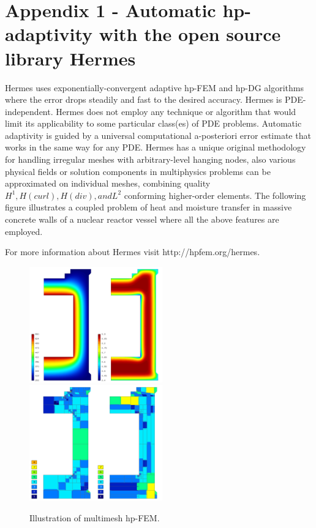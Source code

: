 \documentclass[12pt]{elsarticle}
\begin{document}
\section{Appendix 1 - Automatic hp-adaptivity with the open source library Hermes}

Hermes uses exponentially-convergent adaptive hp-FEM and hp-DG algorithms where the error drops steadily and fast to the desired accuracy.
Hermes is PDE-independent. Hermes does not employ any technique or algorithm that would limit its applicability to some particular class(es) of PDE problems. Automatic adaptivity is guided by a universal computational a-posteriori error estimate that works in the same way for any PDE.
Hermes has a unique original methodology for handling irregular meshes with arbitrary-level hanging nodes, also various physical fields or solution components in multiphysics problems can be approximated on individual meshes, combining quality $H^1, H(curl), H(div), and L^2$ conforming higher-order elements. The following figure illustrates a coupled problem of heat and moisture transfer in massive concrete walls of a nuclear reactor vessel where all the above features are employed.

For more information about Hermes visit {http://hpfem.org/hermes}.

\begin{figure}[!ht]
\centering
\includegraphics[height=5cm]{img/hermes_hm_sol.png}
\hspace{10mm}
\includegraphics[height=5cm]{img/hermes_hm_mesh.png}
\caption{Illustration of multimesh hp-FEM.}
\label{fig:hermes_hm}
\end{figure}
\noindent
\end{document}
